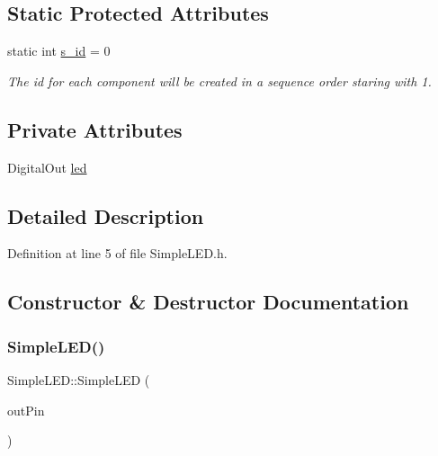 \subsection*{Static Protected Attributes}
\begin{DoxyCompactItemize}
\item 
static int \hyperlink{class_abstract_component_a99ce3e5fe7d73dac569b874c15fcaf0d}{s\+\_\+id} = 0
\begin{DoxyCompactList}\small\item\em The id for each component will be created in a sequence order staring with 1. \end{DoxyCompactList}\end{DoxyCompactItemize}
\subsection*{Private Attributes}
\begin{DoxyCompactItemize}
\item 
Digital\+Out \hyperlink{class_simple_l_e_d_ae16514a63d8a19ab12e9adb19bba086d}{led}
\end{DoxyCompactItemize}


\subsection{Detailed Description}


Definition at line 5 of file Simple\+L\+E\+D.\+h.



\subsection{Constructor \& Destructor Documentation}
\mbox{\label{class_simple_l_e_d_afec6f532dbc735f2fd95a2d080e7398d}} 
\subsubsection{\texorpdfstring{Simple\+L\+E\+D()}{SimpleLED()}\hspace{0.1cm}{\footnotesize\ttfamily [1/2]}}
{\footnotesize\ttfamily Simple\+L\+E\+D\+::\+Simple\+L\+ED (\begin{DoxyParamCaption}\item[{Pin\+Name}]{out\+Pin }\end{DoxyParamCaption})}



